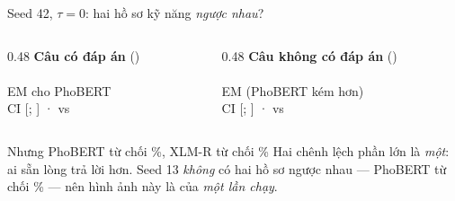 \begin{frame}{Seed 42, $\tau = 0$: hai hồ sơ kỹ năng \emph{ngược nhau}?}
\begin{columns}[T]
\begin{column}{0.48\textwidth}
\centering
\textbf{Câu có đáp án} ({\NValAns})\\[4pt]
\\
\small EM cho PhoBERT\\
\footnotesize CI [\PairAnsLo; \PairAnsHi] · \textcolor{phobert}{\PhobertAnsEM} vs \textcolor{xlmr}{\XlmrAnsEM}
\end{column}
\begin{column}{0.48\textwidth}
\centering
\textbf{Câu không có đáp án} ({\NValImp})\\[4pt]
\\
\small EM (PhoBERT kém hơn)\\
\footnotesize CI [\PairImpLo; \PairImpHi] · \textcolor{phobert}{\PhobertImpEM} vs \textcolor{xlmr}{\XlmrImpEM}
\end{column}
\end{columns}

\vspace{1.2em}
\begin{block}{Nhưng PhoBERT từ chối \PhobertAbsRate\%, XLM-R từ chối \XlmrAbsRate\%}
\small Hai chênh lệch phần lớn là \emph{một}: ai sẵn lòng trả lời hơn. Seed 13 \emph{không} có hai hồ sơ ngược
nhau --- PhoBERT từ chối \PhobertThirteenAbsRate\% --- nên hình ảnh này là của \emph{một lần chạy}.
\end{block}
\end{frame}


